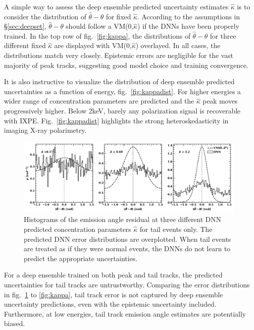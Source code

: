 A simple way to assess the deep ensemble predicted uncertainty estimates $\hat{\kappa}$ is to consider the distribution of $\hat{\theta} - \theta$ for fixed $\hat{\kappa}$. According to the assumptions in \S\ref{sec:deepset}, $\hat{\theta} - \theta$ should follow a VM(0,$\hat{\kappa}$) if the DNNs have been properly trained. In the top row of fig.~\ref{fig:kappa}, the distributions of $\hat{\theta} - \theta$ for three different fixed $\hat{\kappa}$ are displayed with VM(0,$\hat{\kappa}$) overlayed. In all cases, the distributions match very closely. Epistemic errors are negligible for the vast majority of peak tracks, suggesting good model choice and training convergence.

It is also instructive to visualize the distribution of deep ensemble predicted uncertainties as a function of energy, fig.~\ref{fig:kappadist}. For higher energies a wider range of concentration parameters are predicted and the $\hat{\kappa}$ peak moves progressively higher. Below 2keV, barely any polarization signal is recoverable with IXPE. Fig.~\ref{fig:kappadist} highlights the strong heteroskedasticity in imaging X-ray polarimetry.

\begin{figure}[b]
\centering
\includegraphics[width=1.0\textwidth]{figures/kappa_tail.pdf}
\caption{Histograms of the emission angle residual at three different DNN predicted concentration parameters $\hat{\kappa}$ for tail events only. The predicted DNN error distributions are overplotted. When tail events are treated as if they were normal events, the DNNs do not learn to predict the appropriate uncertainties.}
\label{fig:kappa_tail}
\end{figure}

For a deep ensemble trained on both peak and tail tracks, the predicted uncertainties for tail tracks are untrustworthy. Comparing the error distributions in fig.~\ref{fig:kappa_tail} to \ref{fig:kappa}, tail track error is not captured by deep ensemble uncertainty predictions, even with the epistemic uncertainty included. Furthermore, at low energies, tail track emission angle estimates are potentially biased.

